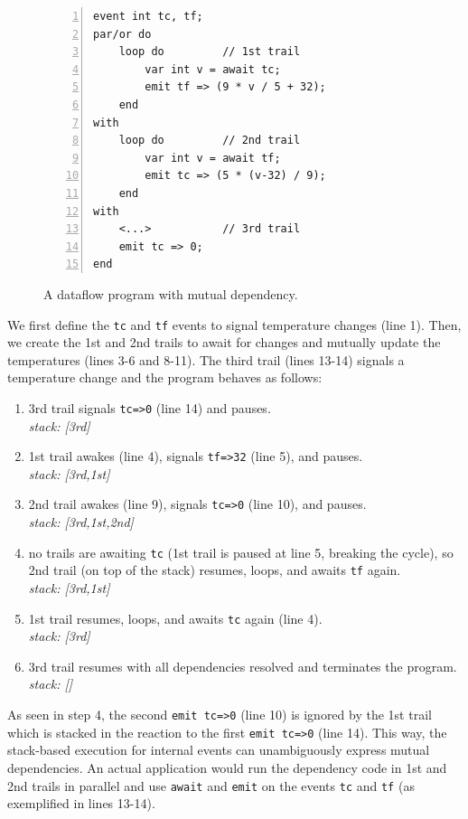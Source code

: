 \documentclass{acm_proc_article-sp}
\newcommand{\code}[1] {{\small{\texttt{#1}}}}
\newcommand{\1}{\;}
\newcommand{\2}{\;\;}
\newcommand{\3}{\;\;\;}
\newcommand{\5}{\;\;\;\;\;}
\begin{document}
\begin{figure}[t]
\begin{minipage}[t]{0.22\linewidth}
\hspace{0.0cm}
\end{minipage}
%
\begin{minipage}[t]{0.10\linewidth}
\hspace{0.4cm}
\end{minipage}
\begin{minipage}[t]{0.67\linewidth}
\begin{lstlisting}[numbers=left,xleftmargin=1em]
event int tc, tf;
par/or do
    loop do         // 1st trail
        var int v = await tc;
        emit tf => (9 * v / 5 + 32);
    end
with
    loop do         // 2nd trail
        var int v = await tf;
        emit tc => (5 * (v-32) / 9);
    end
with
    <...>           // 3rd trail
    emit tc => 0;
end
\end{lstlisting}
\end{minipage}
\caption{ A dataflow program with mutual dependency.
\label{lst.frp2}
}
\end{figure}
%
We first define the \code{tc} and \code{tf} events to signal temperature 
changes (line 1).
Then, we create the 1st and 2nd trails to await for changes and mutually update 
the temperatures (lines 3-6 and 8-11).
The third trail (lines 13-14) signals a temperature change and the program 
behaves as follows:
%
{\small
\begin{enumerate}
\setlength{\itemsep}{0pt}
\item 3rd trail signals \code{tc=>0} (line 14) and pauses.\\
    \emph{stack: [3rd]}
\item 1st trail awakes (line 4), signals \code{tf=>32} (line 5), and pauses.\\
    \emph{stack: [3rd,1st]}
\item 2nd trail awakes (line 9), signals \code{tc=>0} (line 10), and pauses.\\
    \emph{stack: [3rd,1st,2nd]}
\item no trails are awaiting \code{tc} (1st trail is paused at line 5, breaking 
    the cycle), so 2nd trail (on top of the stack) resumes, loops, and awaits 
\code{tf} again.\\
    \emph{stack: [3rd,1st]}
\item 1st trail resumes, loops, and awaits \code{tc} again (line 4).\\
    \emph{stack: [3rd]}
\item 3rd trail resumes with all dependencies resolved and terminates the 
    program.\\
    \emph{stack: []}
\end{enumerate}
}
%
As seen in step 4, the second \code{emit tc=>0} (line 10) is ignored by the 1st 
trail which is stacked in the reaction to the first \code{emit tc=>0} (line 
14).
%
This way, the stack-based execution for internal events can unambiguously 
express mutual dependencies.
%
%
An actual application would run the dependency code in 1st and 2nd trails in 
parallel and use \code{await} and \code{emit} on the events \code{tc} and 
\code{tf} (as exemplified in lines 13-14).
\end{document}
